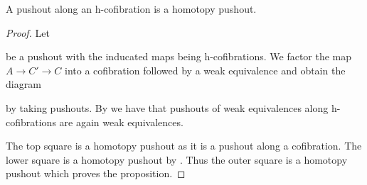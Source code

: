 \begin{prop}\label{prop:poAlongHCofibIsHtpyPo}
    A pushout along an h-cofibration is a homotopy pushout.
    \begin{proof}
        Let
        \begin{center}
        \end{center}
        be a pushout with the inducated maps being h-cofibrations.
        We factor the map $A\to C'\to C$ into a cofibration followed by a weak equivalence and obtain the diagram
        \begin{center}
        \end{center}
        by taking pushouts.
        By %
        we have that pushouts of weak equivalences along h-cofibrations are again weak equivalences.

        The top square is a homotopy pushout as it is a pushout along a cofibration. 
        The lower square is a homotopy pushout by %
        .
        Thus the outer square is a homotopy pushout which proves the proposition.
    \end{proof}
\end{prop}
